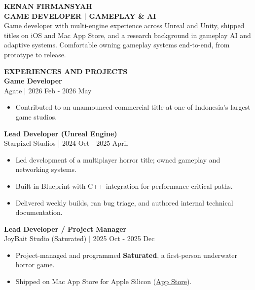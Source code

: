 \documentclass[11pt,a4paper]{article}
\newcommand{\mainsection}[1]{%
    {\large\bfseries\MakeUppercase{#1}}\\[8pt]%
}
\newcommand{\jobentry}[2]{%
    \textbf{#1}\\
    {\small\color{lighttext}#2}\\[4pt]%
}
\begin{document}
\begin{minipage}[t]{14cm}
\vspace{0.5cm}
\hspace{0.8cm}
\begin{minipage}[t]{12.5cm}

{\Huge\bfseries\MakeUppercase{Kenan Firmansyah}}\\[6pt]
{\large\bfseries GAME DEVELOPER | GAMEPLAY \& AI}\\[12pt]

{\small Game developer with multi-engine experience across Unreal and Unity, shipped titles on iOS and Mac App Store, and a research background in gameplay AI and adaptive systems. Comfortable owning gameplay systems end-to-end, from prototype to release.}

\vspace{0.6cm}

\mainsection{Experiences and Projects}

\jobentry{Game Developer}{Agate | 2026 Feb - 2026 May}
\begin{itemize}[leftmargin=*, nosep, itemsep=2pt, topsep=2pt]
    \item Contributed to an unannounced commercial title at one of Indonesia's largest game studios.
\end{itemize}

\vspace{0.4cm}

\jobentry{Lead Developer (Unreal Engine)}{Starpixel Studios | 2024 Oct - 2025 April}
\begin{itemize}[leftmargin=*, nosep, itemsep=2pt, topsep=2pt]
    \item Led development of a multiplayer horror title; owned gameplay and networking systems.
    \item Built in Blueprint with C++ integration for performance-critical paths.
    \item Delivered weekly builds, ran bug triage, and authored internal technical documentation.
\end{itemize}

\vspace{0.4cm}

\jobentry{Lead Developer / Project Manager}{JoyBait Studio (Saturated) | 2025 Oct - 2025 Dec}
\begin{itemize}[leftmargin=*, nosep, itemsep=2pt, topsep=2pt]
    \item Project-managed and programmed \textbf{Saturated}, a first-person underwater horror game.
    \item Shipped on Mac App Store for Apple Silicon (\href{https://apps.apple.com/id/app/saturated/id6755347604}{\color{accent}\underline{App Store}}).
\end{itemize}


\end{minipage}
\end{minipage}
\end{document}
